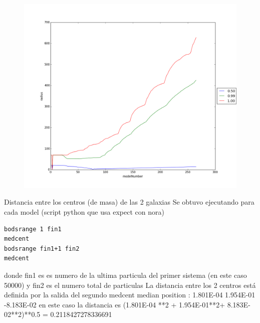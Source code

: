 \documentclass[12pt]{book}
\begin{document}
\begin{itemize}
\begin{figure}[!h]
 \centering
 \includegraphics[scale=0.4]{imgRadcon2.png}
 \caption{\emph{}}
 \label{Fig: 2}
\end{figure}

Distancia entre los centros (de masa) de las 2 galaxias
Se obtuvo ejecutando para cada model (script python que usa expect con nora)
\begin{verbatim}
bodsrange 1 fin1
medcent
bodsrange fin1+1 fin2
medcent
\end{verbatim}
donde fin1 es es numero de la ultima particula del primer sistema (en este caso 50000) y fin2 es el numero total de particulas
La distancia entre los 2 centros está definida por la salida del segundo medcent 
median position :    1.801E-04   1.954E-01  -8.183E-02
en este caso la distancia es  (1.801E-04 **2 +  1.954E-01**2+  8.183E-02**2)**0.5 = 0.2118427278336691




\end{itemize}
\end{document}
